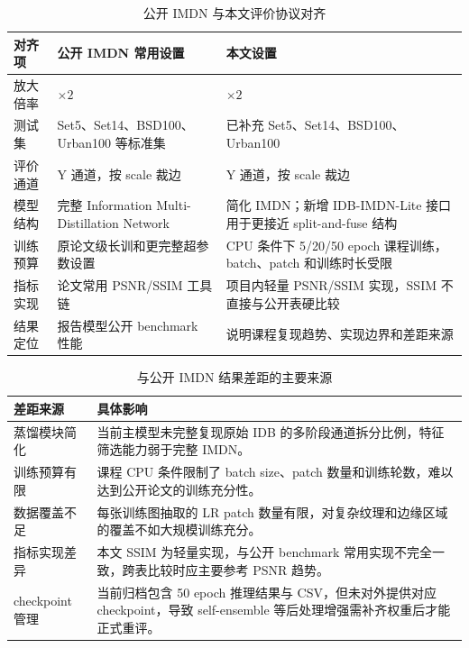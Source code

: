 \documentclass[bwprint]{report}
\begin{document}
\begin{table}[H]
    \centering
    \caption{公开 IMDN 与本文评价协议对齐}
    \label{tab:protocol-alignment}
    \small
    \begin{tabular}{>{\raggedright\arraybackslash}p{2.4cm}>{\raggedright\arraybackslash}p{4.0cm}>{\raggedright\arraybackslash}p{4.9cm}}
        \toprule
        对齐项 & 公开 IMDN 常用设置 & 本文设置 \\
        \midrule
        放大倍率 & $\times2$ & $\times2$ \\
        测试集 & Set5、Set14、BSD100、Urban100 等标准集 & 已补充 Set5、Set14、BSD100、Urban100 \\
        评价通道 & Y 通道，按 scale 裁边 & Y 通道，按 scale 裁边 \\
        模型结构 & 完整 Information Multi-Distillation Network & 简化 IMDN；新增 IDB-IMDN-Lite 接口用于更接近 split-and-fuse 结构 \\
        训练预算 & 原论文级长训和更完整超参数设置 & CPU 条件下 5/20/50 epoch 课程训练，batch、patch 和训练时长受限 \\
        指标实现 & 论文常用 PSNR/SSIM 工具链 & 项目内轻量 PSNR/SSIM 实现，SSIM 不直接与公开表硬比较 \\
        结果定位 & 报告模型公开 benchmark 性能 & 说明课程复现趋势、实现边界和差距来源 \\
        \bottomrule
    \end{tabular}
\end{table}

\begin{table}[H]
    \centering
    \caption{与公开 IMDN 结果差距的主要来源}
    \label{tab:gap-attribution}
    \small
    \begin{tabular}{>{\raggedright\arraybackslash}p{3.0cm}>{\raggedright\arraybackslash}p{8.2cm}}
        \toprule
        差距来源 & 具体影响 \\
        \midrule
        蒸馏模块简化 & 当前主模型未完整复现原始 IDB 的多阶段通道拆分比例，特征筛选能力弱于完整 IMDN。 \\
        训练预算有限 & 课程 CPU 条件限制了 batch size、patch 数量和训练轮数，难以达到公开论文的训练充分性。 \\
        数据覆盖不足 & 每张训练图抽取的 LR patch 数量有限，对复杂纹理和边缘区域的覆盖不如大规模训练充分。 \\
        指标实现差异 & 本文 SSIM 为轻量实现，与公开 benchmark 常用实现不完全一致，跨表比较时应主要参考 PSNR 趋势。 \\
        checkpoint 管理 & 当前归档包含 50 epoch 推理结果与 CSV，但未对外提供对应 checkpoint，导致 self-ensemble 等后处理增强需补齐权重后才能正式重评。 \\
        \bottomrule
    \end{tabular}
\end{table}
\end{document}
